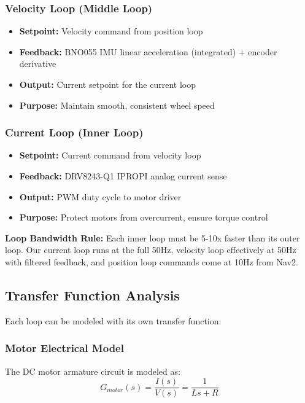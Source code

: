 \documentclass[11pt,letterpaper]{article}
\begin{document}
\subsubsection{Velocity Loop (Middle Loop)}
\begin{itemize}
    \item \textbf{Setpoint:} Velocity command from position loop
    \item \textbf{Feedback:} BNO055 IMU linear acceleration (integrated) + encoder derivative
    \item \textbf{Output:} Current setpoint for the current loop
    \item \textbf{Purpose:} Maintain smooth, consistent wheel speed
\end{itemize}

\subsubsection{Current Loop (Inner Loop)}
\begin{itemize}
    \item \textbf{Setpoint:} Current command from velocity loop
    \item \textbf{Feedback:} DRV8243-Q1 IPROPI analog current sense
    \item \textbf{Output:} PWM duty cycle to motor driver
    \item \textbf{Purpose:} Protect motors from overcurrent, ensure torque control
\end{itemize}

\begin{keypoint}
\textbf{Loop Bandwidth Rule:} Each inner loop must be 5-10x faster than its outer loop. Our current loop runs at the full 50Hz, velocity loop effectively at 50Hz with filtered feedback, and position loop commands come at 10Hz from Nav2.
\end{keypoint}

\subsection{Transfer Function Analysis}

Each loop can be modeled with its own transfer function:

\subsubsection{Motor Electrical Model}
The DC motor armature circuit is modeled as:
\begin{equation}
G_{motor}(s) = \frac{I(s)}{V(s)} = \frac{1}{Ls + R}
\end{equation}
\end{document}
